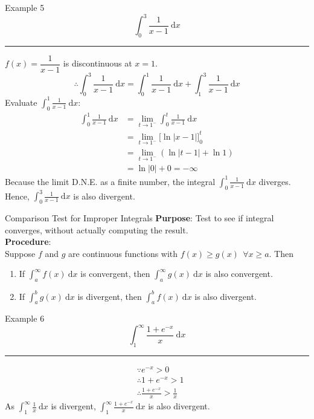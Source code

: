\documentclass[12pt,a4paper]{article}
\def\d{{\mathrm{d}}}
\begin{document}
\begin{eg}{Example 5}
	$$\int_0^3\frac{1}{x-1}\ \d x$$
	\noindent\rule[0.25\baselineskip]{\textwidth}{1pt}
	$f(x)=\dfrac{1}{x-1}$ is discontinuous at $x=1$.
	$$\therefore\int_0^3\frac{1}{x-1}\ \d x=\int_0^1\frac{1}{x-1}\ \d x+\int_1^3\frac{1}{x-1}\ \d x$$
	Evaluate $\displaystyle\int_0^1\frac{1}{x-1}\ \d x$: 
	$$\begin{aligned}
		\int_0^1\frac{1}{x-1}\ \d x&=\lim_{t\to1^-}\int_0^t\frac{1}{x-1}\ \d x\\
		&=\lim_{t\to1^-}\bigg[\ln|x-1|\bigg]^t_0\\
		&=\lim_{t\to1^-}\left(\ln|t-1|+\ln1\right)\\
		&=\ln|0|+0=-\infty
	\end{aligned}$$
	Because the limit D.N.E. as a finite number, the integral $\displaystyle\int_0^1\frac{1}{x-1}\ \d x$ diverges. \\
	Hence, $\displaystyle\int_0^3\frac{1}{x-1}\ \d x$ is also divergent. 
\end{eg}
\begin{thm}{Comparison Test for Improper Integrals}
	\textbf{Purpose}: Test to see if integral converges, without actually computing the result. \\
	\textbf{Procedure}: \\
	Suppose $f$ and $g$ are continuous functions with $f(x)\geq g(x)\ \ \forall x\geq a$. Then
	\begin{enumerate}
		\item If $\displaystyle\int_a^\infty f(x)\ \d x$ is convergent, then $\displaystyle\int_a^\infty g(x)\ \d x$ is also convergent. 
		\item If $\displaystyle\int_a^b g(x)\ \d x$ is divergent, then $\displaystyle\int_a^b f(x)\ \d x$ is also divergent. 
	\end{enumerate}
\end{thm}
\begin{eg}{Example 6}
	$$\int_1^\infty\frac{1+e^{-x}}{x}\ \d x$$
	\noindent\rule[0.25\baselineskip]{\textwidth}{1pt}
	$$\begin{aligned} 
		&\because e^{-x}>0\\
		&\therefore 1+e^{-x}>1\\
		&\therefore\frac{1+e^{-x}}{x}>\frac{1}{x}
	\end{aligned}$$
	As $\displaystyle\int_1^\infty\frac{1}{x}\ \d x$ is divergent, $\displaystyle\int_1^\infty\frac{1+e^{-x}}{x}\ \d x$ is also divergent. 
\end{eg}
\end{document}
